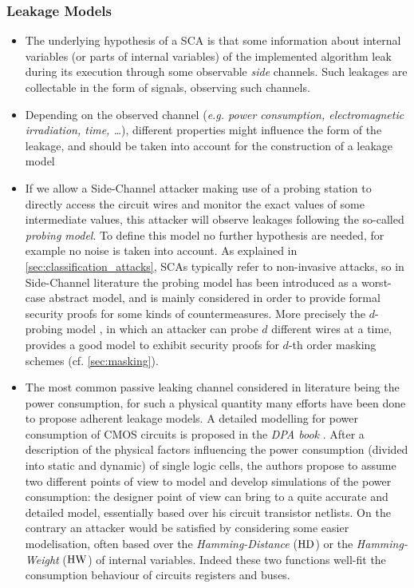 \subsubsection{Leakage Models}
\begin{itemize}


\item The underlying hypothesis of a SCA is that some information about internal variables (or parts of internal variables) of the implemented algorithm leak during its execution through some observable \emph{side} channels. Such leakages are collectable in the form of signals, observing such channels. 

\item Depending on the observed channel (\emph{e.g. power consumption, electromagnetic irradiation, time, \dots}), different properties might influence the form of the leakage, and should be taken into account for the construction of a leakage model
\item If we allow a Side-Channel attacker making use of a probing station to directly access the circuit wires and monitor the exact values of some intermediate values, this attacker will observe leakages following the so-called \emph{probing model}. To define this model no further hypothesis are needed, for example no noise is taken into account. As explained in \ref{sec:classification_attacks}, SCAs typically refer to non-invasive attacks, so in Side-Channel literature the probing model has been introduced as a worst-case abstract model, and is mainly considered in order to provide formal security proofs for some kinds of countermeasures. More precisely the $d$-probing model \cite{ishai2003private}, in which an attacker can probe $d$ different wires at a time, provides a good model to exhibit security proofs for $d$-th order masking schemes (cf. \ref{sec:masking}). 
\item The most common passive leaking channel considered in literature being the power consumption, for such a physical quantity many efforts have been done to propose adherent leakage models. A detailed modelling for power consumption of CMOS circuits is proposed in the \emph{DPA book} \cite{mangard2008power}. After a description of the physical factors influencing the power consumption (divided into static and dynamic) of single logic cells, the authors propose to assume two different points of view to model and develop simulations of the power consumption: the designer point of view can bring to a quite accurate and detailed model, essentially based over his circuit transistor netlists. On the contrary an attacker would be satisfied by considering some easier modelisation, often based over the \emph{Hamming-Distance} ($\mathrm{HD}$) or the \emph{Hamming-Weight} ($\mathrm{HW}$) of internal variables. Indeed these two functions well-fit the consumption behaviour of circuits registers and buses. 

\end{itemize}
